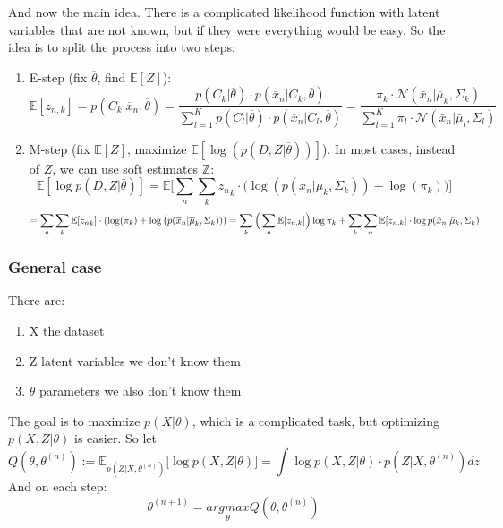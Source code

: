 And now the main idea. There is a complicated likelihood function with latent variables that are not known, but if they were everything would be easy. 
So the idea is to split the process into two steps:
\begin{enumerate}
    \item E-step (fix $\overline{\theta}$, find $\mathbb{E}[Z]$):
    \[\mathbb{E}[z_{n, k}] = p(C_k|\overline{x}_n,\overline{\theta}) 
    = \displaystyle \frac{p(C_k|\overline{\theta})\cdot p(\overline{x}_n|C_k,\overline{\theta})}{\sum\limits_{l=1}^K p(C_l|\overline{\theta})\cdot p(\overline{x}_n|C_l,\overline{\theta})}
    = \displaystyle \frac{\pi_k\cdot \mathcal{N}(\bar x_n | \bar \mu_k, \Sigma_k)}{\sum\limits_{l=1}^K \pi_l \cdot \mathcal{N}(\bar x_n | \bar \mu_l, \Sigma_l)}\]
    \item M-step (fix $\mathbb{E}[Z]$, maximize $\mathbb{E}[\log(p(D,Z|\overline{\theta}))]$). In most cases, instead of $Z$, we can use soft estimates $\mathbb{Z}$:
    \[\mathbb{E}[\log p(D,Z|\bar\theta)] 
    = \mathbb{E}\Big[\sum\limits_n\sum\limits_k {z_n}_k \cdot \big(\log(p(\overline{x}_n|\overline{\mu}_k, \Sigma_k)) + \log(\pi_k)\big)\Big]\] 
    \[ = \sum\limits_n\sum\limits_k\mathbb{E}[{z_n}_k]\cdot(\log(\pi_k) + \log\big(p(\overline{x}_n|\overline{\mu}_k, \Sigma_k))) \newline
    = \sum\limits_k\Big(\sum\limits_n\mathbb{E}[z_{n,k}]\Big) \log \pi_k + \sum\limits_k\sum\limits_n\mathbb{E}[z_{n,k}]\cdot \log p(\bar x_n|\bar\mu_k,\Sigma_k)\]
\end{enumerate}

\subsubsection{General case}
There are:
\begin{enumerate}
    \item X \- the dataset
    \item Z \- latent variables we don't know them
    \item $\theta$ \- parameters we also don't know them
\end{enumerate}
The goal is to maximize $p(X|\theta)$, which is a complicated task, but optimizing $p(X, Z|\theta)$ is easier. So let
\[Q(\theta, \theta^{(n)}) := \mathbb{E}_{p(Z|X,\theta^{(n)})} \big[\log p(X,Z|\theta)\big]
= \int \log p(X,Z|\theta) \cdot p(Z|X,\theta^{(n)}) dz \]
And on each step:
\[\theta^{(n+1)} = \underset{\theta}{argmax}Q(\theta, \theta^{(n)})\]

